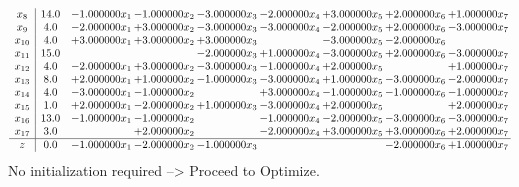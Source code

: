 \documentclass[10pt]{article}
\begin{document}
\[\begin{array}{c| c c@{\hskip 2pt} c@{\hskip 2pt} c@{\hskip 2pt} c@{\hskip 2pt} c@{\hskip 2pt} c@{\hskip 2pt} c@{\hskip 2pt} }
 x_{8}   &  14.0 & -1.000000 x_{1} & -1.000000 x_{2} & -3.000000 x_{3} & -2.000000 x_{4} & + 3.000000 x_{5} & + 2.000000 x_{6} & + 1.000000 x_{7}\\
 x_{9}   &  4.0 & -2.000000 x_{1} & + 3.000000 x_{2} & -3.000000 x_{3} & -3.000000 x_{4} & -2.000000 x_{5} & + 2.000000 x_{6} & -3.000000 x_{7}\\
 x_{10}   &  4.0 & + 3.000000 x_{1} & + 3.000000 x_{2} & + 3.000000 x_{3} &   & -3.000000 x_{5} & -2.000000 x_{6} &   \\
 x_{11}   &  15.0  &    &   & -2.000000 x_{3} & + 1.000000 x_{4} & -3.000000 x_{5} & + 2.000000 x_{6} & -3.000000 x_{7}\\
 x_{12}   &  4.0 & -2.000000 x_{1} & + 3.000000 x_{2} & -3.000000 x_{3} & -1.000000 x_{4} & + 2.000000 x_{5} &   & + 1.000000 x_{7}\\
 x_{13}   &  8.0 & + 2.000000 x_{1} & + 1.000000 x_{2} & -1.000000 x_{3} & -3.000000 x_{4} & + 1.000000 x_{5} & -3.000000 x_{6} & -2.000000 x_{7}\\
 x_{14}   &  4.0 & -3.000000 x_{1} & -1.000000 x_{2} &   & + 3.000000 x_{4} & -1.000000 x_{5} & -1.000000 x_{6} & -1.000000 x_{7}\\
 x_{15}   &  1.0 & + 2.000000 x_{1} & -2.000000 x_{2} & + 1.000000 x_{3} & -3.000000 x_{4} & + 2.000000 x_{5} &   & + 2.000000 x_{7}\\
 x_{16}   &  13.0 & -1.000000 x_{1} & -1.000000 x_{2} &   & -1.000000 x_{4} & -2.000000 x_{5} & -3.000000 x_{6} & -3.000000 x_{7}\\
 x_{17}   &  3.0  &   & + 2.000000 x_{2} &   & -2.000000 x_{4} & + 3.000000 x_{5} & + 3.000000 x_{6} & + 2.000000 x_{7}\\
\hline
z    &  0.0 & -1.000000 x_{1} & -2.000000 x_{2} & -1.000000 x_{3} &    &   & -2.000000 x_{6} & + 1.000000 x_{7}\\
\end{array}\]
No initialization required --> Proceed to Optimize. 
\end{document}
